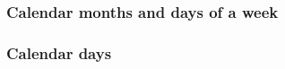 \documentclass[../nihongo-gakushuu-kyouzai.tex]{subfiles}
\begin{document}
\begin{multicols}{2}
\subsubsection{Calendar months and days of a week}
\begin{center}
\label{tbl:appendix-vocab-nouns-calendar-months-and-days-of-a-week}
\end{center}


\subsubsection{Calendar days}
\begin{center}
\label{tbl:appendix-vocab-nouns-calendar-days}
\end{center}



\end{multicols}
\end{document}
